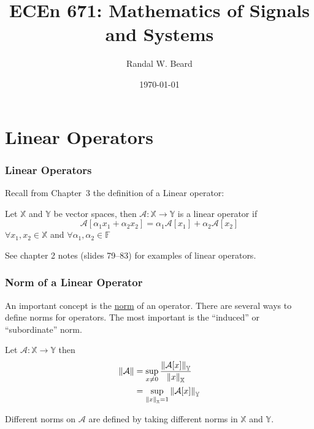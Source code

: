 \documentclass{beamer}
\title{ECEn 671: Mathematics of Signals and Systems}
\author{Randal W. Beard}
\institute{Brigham Young University}
\date{\today}
\begin{document}
\begin{frame}
	\titlepage
\end{frame}

\section{Linear Operators}
\frame{\sectionpage}


\begin{frame}\frametitle{Linear Operators}
	Recall from Chapter~3 the definition of a Linear operator:  
	\begin{definition}
	Let $\mathbb{X}$ and $\mathbb{Y}$ be vector spaces, then $\mathcal{A}:\mathbb{X} \to \mathbb{Y}$ is a linear operator if
	\[ 
	\mathcal{A}[\alpha_1 x_1 + \alpha_2 x_2 ] = \alpha_1 \mathcal{A}[x_1] + \alpha_2 \mathcal{A}[x_2] 
	\]	
	$\forall x_1,x_2 \in \mathbb{X}$ and $\forall \alpha_1,\alpha_2 \in \mathbb{F}$
	\end{definition}
	
	\vfill
	See chapter 2 notes (slides 79--83) for examples of linear operators.
\end{frame}

\begin{frame}\frametitle{Norm of a Linear Operator}
	An important concept is the \underline{norm} of an operator.  There are several ways to define norms for operators.  The most important is the ``induced'' or ``subordinate'' norm.
	
	\vfill
	
	\begin{definition}
		Let $\mathcal{A}:\mathbb{X} \to \mathbb{Y}$ then
		\begin{align*}
		\left\|\mathcal{A}\right\| &= \sup_{x \neq 0} \frac{\left\|\mathcal{A}[x]\right\|_{\mathbb{Y}}}{\left\|x\right\|_{\mathbb{X}}} \\
		&= \sup_{\left\|x\right\|_{\mathbb{X}}=1} \left\|\mathcal{A}[x]\right\|_{\mathbb{Y}} 
		\end{align*}
	\end{definition}
	
	\vfill
	
	Different norms on $\mathcal{A}$ are defined by taking different norms in $\mathbb{X}$ and $\mathbb{Y}$.
\end{frame}
\end{document}
